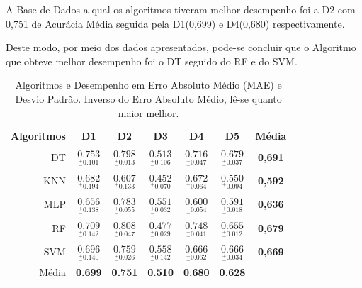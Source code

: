 \documentclass[12pt]{article}
\begin{document}
A Base de Dados a qual os algoritmos tiveram melhor desempenho foi a D2 com 0,751 de Acurácia Média seguida pela D1(0,699) e  D4(0,680) respectivamente. 

Deste modo, por meio dos dados apresentados, pode-se concluir que o Algoritmo que obteve melhor desempenho foi o DT seguido do RF e do SVM.

\begin{table}[h!]
  \begin{center}
    \caption{Algoritmos e Desempenho em Erro Absoluto Médio (MAE) e Desvio Padrão. Inverso do Erro Absoluto Médio, lê-se quanto maior melhor. }
    \label{tab_desempenho}
    \begin{tabular}{r|c|c|c|c|c|c}
      \textbf{Algoritmos} & \textbf{D1}                                    & \textbf{D2}                                    & \textbf{D3}                                    & \textbf{D4}                                     & \textbf{D5}    & \textbf{Média }                               \\
      DT                  & \( \underset{_{-}^{+}\textrm{0.101}}{0.753} \) & \( \underset{_{-}^{+}\textrm{0.013}}{0.798} \) & \( \underset{_{-}^{+}\textrm{0.106}}{0.513} \) & \( \underset{_{-}^{+}\textrm{0.047}}{0.716} \)  & \( \underset{_{-}^{+}\textrm{0.037}}{0.679} \) & \textbf{0,691} \\ \hline
      KNN                 & \( \underset{_{-}^{+}\textrm{0.194}}{0.682} \) & \( \underset{_{-}^{+}\textrm{0.133}}{0.607} \) & \( \underset{_{-}^{+}\textrm{0.070}}{0.452} \) & \( \underset{_{-}^{+}\textrm{0.064}}{0.672} \)  & \( \underset{_{-}^{+}\textrm{0.094}}{0.550 } \) & \textbf{0,592} \\ \hline
      MLP                 & \( \underset{_{-}^{+}\textrm{0.138}}{0.656} \) & \( \underset{_{-}^{+}\textrm{0.055}}{0.783} \) & \( \underset{_{-}^{+}\textrm{0.032}}{0.551} \) & \( \underset{_{-}^{+}\textrm{0.054}}{0.600} \)  & \( \underset{_{-}^{+}\textrm{0.018}}{0.591} \) & \textbf{0,636} \\ \hline
      RF                  & \( \underset{_{-}^{+}\textrm{0.142}}{0.709} \) & \( \underset{_{-}^{+}\textrm{0.047}}{0.808} \) & \( \underset{_{-}^{+}\textrm{0.029}}{0.477} \) & \( \underset{_{-}^{+}\textrm{0.041}}{0.748} \)  & \( \underset{_{-}^{+}\textrm{0.012}}{0.655} \) & \textbf{0,679} \\ \hline
      SVM                 & \( \underset{_{-}^{+}\textrm{0.140}}{0.696} \) & \( \underset{_{-}^{+}\textrm{0.026}}{0.759} \) & \( \underset{_{-}^{+}\textrm{0.142}}{0.558} \) & \( \underset{_{-}^{+}\textrm{0.062}}{0.666 } \) & \( \underset{_{-}^{+}\textrm{0.034}}{0.666} \) & \textbf{0,669}  \\ \hline
      Média               & \textbf{0.699}  & \textbf{0.751}  & \textbf{0.510}  & \textbf{0.680}  & \textbf{0.628}  & \\ \hline
    \end{tabular}
  \end{center}
\end{table}
\end{document}
